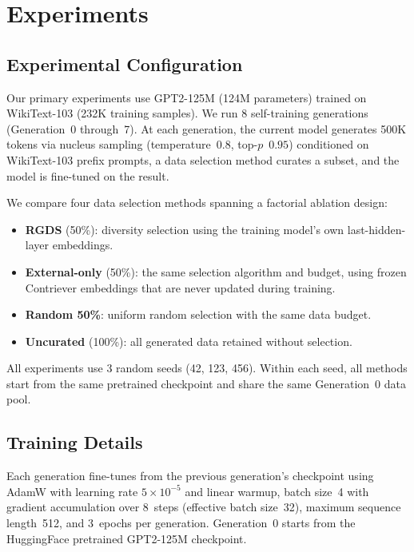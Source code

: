 \section{Experiments}
\label{sec:experiments}

\subsection{Experimental Configuration}

Our primary experiments use GPT2-125M (124M parameters) trained on WikiText-103 (232K training samples). We run 8 self-training generations (Generation~0 through~7). At each generation, the current model generates 500K tokens via nucleus sampling (temperature~$0.8$, top-$p$~$0.95$) conditioned on WikiText-103 prefix prompts, a data selection method curates a subset, and the model is fine-tuned on the result.

We compare four data selection methods spanning a factorial ablation design:
\begin{itemize}
    \item \textbf{RGDS} (50\%): diversity selection using the training model's own last-hidden-layer embeddings.
    \item \textbf{External-only} (50\%): the same selection algorithm and budget, using frozen Contriever \citep{izacard2022unsupervised} embeddings that are never updated during training.
    \item \textbf{Random 50\%}: uniform random selection with the same data budget.
    \item \textbf{Uncurated} (100\%): all generated data retained without selection.
\end{itemize}

All experiments use 3 random seeds (42, 123, 456). Within each seed, all methods start from the same pretrained checkpoint and share the same Generation~0 data pool.

\subsection{Training Details}

Each generation fine-tunes from the previous generation's checkpoint using AdamW with learning rate $5 \times 10^{-5}$ and linear warmup, batch size~4 with gradient accumulation over 8~steps (effective batch size~32), maximum sequence length~512, and 3~epochs per generation. Generation~0 starts from the HuggingFace pretrained GPT2-125M checkpoint.

